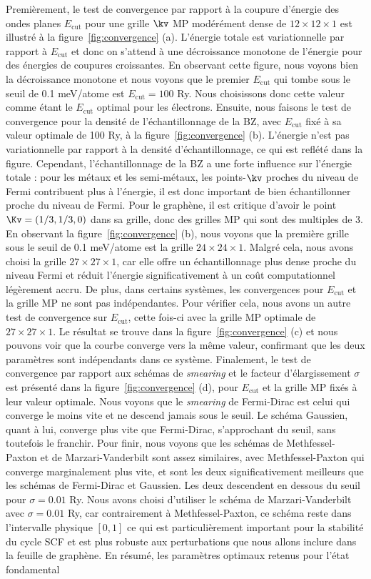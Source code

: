 Premièrement, le test de convergence par rapport à la coupure d'énergie des ondes planes $E_\text{cut}$ pour une grille $\kv$ MP modérément dense de $12\times12\times1$ est illustré à la figure~\ref{fig:convergence} (a). L'énergie totale est variationnelle par rapport à $E_\text{cut}$ et donc on s'attend à une décroissance monotone de l'énergie pour des énergies de coupures croissantes. En observant cette figure, nous voyons bien la décroissance monotone et nous voyons que le premier $E_\text{cut}$ qui tombe sous le seuil de 0.1 meV/atome est $E_\text{cut}=100$ Ry. Nous choisissons donc cette valeur comme étant le $E_\text{cut}$ optimal pour les électrons. Ensuite, nous faisons le test de convergence pour la densité de l'échantillonnage de la BZ, avec $E_\text{cut}$ fixé à sa valeur optimale de 100 Ry, à la figure~\ref{fig:convergence} (b). L'énergie n'est pas variationnelle par rapport à la densité d'échantillonnage, ce qui est reflété dans la figure. Cependant, l'échantillonnage de la BZ a une forte influence sur l'énergie totale : pour les métaux et les semi-métaux, les points-$\kv$ proches du niveau de Fermi contribuent plus à l'énergie, il est donc important de bien échantillonner proche du niveau de Fermi. Pour le graphène, il est critique d'avoir le point $\Kv=(1/3, 1/3, 0)$ dans sa grille, donc des grilles MP qui sont des multiples de 3. En observant la figure~\ref{fig:convergence} (b), nous voyons que la première grille sous le seuil de 0.1 meV/atome est la grille $24\times24\times1$. Malgré cela, nous avons choisi la grille $27\times27\times1$, car elle offre un échantillonnage plus dense proche du niveau Fermi et réduit l'énergie significativement à un coût computationnel légèrement accru. De plus, dans certains systèmes, les convergences pour $E_\text{cut}$ et la grille MP ne sont pas indépendantes. Pour vérifier cela, nous avons un autre test de convergence sur $E_\text{cut}$, cette fois-ci avec la grille MP optimale de $27\times27\times1$. Le résultat se trouve dans la figure~\ref{fig:convergence} (c) et nous pouvons voir que la courbe converge vers la même valeur, confirmant que les deux paramètres sont indépendants dans ce système. Finalement, le test de convergence par rapport aux schémas de \textit{smearing} et le facteur d'élargissement $\sigma$ est présenté dans la figure~\ref{fig:convergence} (d), pour $E_\text{cut}$ et la grille MP fixés à leur valeur optimale. Nous voyons que le \textit{smearing} de Fermi-Dirac est celui qui converge le moins vite et ne descend jamais sous le seuil. Le schéma Gaussien, quant à lui, converge plus vite que Fermi-Dirac, s'approchant du seuil, sans toutefois le franchir. Pour finir, nous voyons que les schémas de Methfessel-Paxton et de Marzari-Vanderbilt sont assez similaires, avec Methfessel-Paxton qui converge marginalement plus vite, et sont les deux significativement meilleurs que les schémas de Fermi-Dirac et Gaussien. Les deux descendent en dessous du seuil pour $\sigma=0.01$ Ry. Nous avons choisi d'utiliser le schéma de Marzari-Vanderbilt avec $\sigma=0.01$ Ry, car contrairement à Methfessel-Paxton, ce schéma reste dans l'intervalle physique $[0,1]$ ce qui est particulièrement important pour la stabilité du cycle SCF et est plus robuste aux perturbations que nous allons inclure dans la feuille de graphène. En résumé, les paramètres optimaux retenus pour l'état fondamental 
